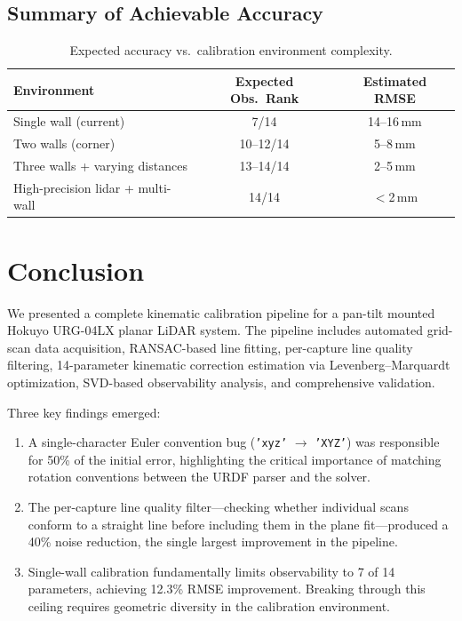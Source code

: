 \documentclass[12pt,a4paper]{article}
\newcommand{\code}[1]{\texttt{#1}}
\begin{document}
\subsection{Summary of Achievable Accuracy}

\begin{table}[H]
\centering
\caption{Expected accuracy vs.\ calibration environment complexity.}
\label{tab:accuracy_forecast}
\begin{tabular}{@{}lcc@{}}
\toprule
Environment & Expected Obs.\ Rank & Estimated RMSE \\
\midrule
Single wall (current)              & 7/14  & 14--16\,mm \\
Two walls (corner)                 & 10--12/14 & 5--8\,mm \\
Three walls + varying distances    & 13--14/14 & 2--5\,mm \\
High-precision lidar + multi-wall  & 14/14 & $<$2\,mm \\
\bottomrule
\end{tabular}
\end{table}


\section{Conclusion}
\label{sec:conclusion}

We presented a complete kinematic calibration pipeline for a pan-tilt
mounted Hokuyo URG-04LX planar LiDAR system. The pipeline includes
automated grid-scan data acquisition, RANSAC-based line fitting,
per-capture line quality filtering, 14-parameter kinematic correction
estimation via Levenberg--Marquardt optimization, SVD-based observability
analysis, and comprehensive validation.

Three key findings emerged:
\begin{enumerate}[nosep]
    \item A single-character Euler convention bug (\code{'xyz'} $\to$
          \code{'XYZ'}) was responsible for 50\% of the initial error,
          highlighting the critical importance of matching rotation
          conventions between the URDF parser and the solver.
    \item The per-capture line quality filter---checking whether individual
          scans conform to a straight line before including them in the
          plane fit---produced a 40\% noise reduction, the single
          largest improvement in the pipeline.
    \item Single-wall calibration fundamentally limits observability to
          7 of 14 parameters, achieving 12.3\% RMSE improvement.
          Breaking through this ceiling requires geometric diversity
          in the calibration environment.
\end{enumerate}
\end{document}
